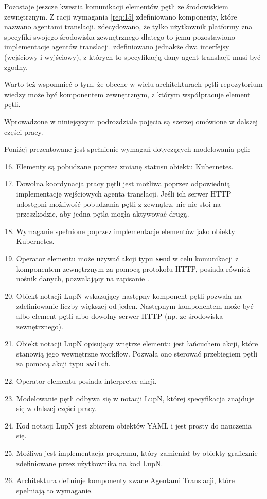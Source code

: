 Pozostaje jeszcze kwestia komunikacji elementów pętli ze środowiskiem zewnętrznym. Z racji wymagania \ref{req:15} zdefiniowano komponenty, które nazwano agentami translacji. zdecydowano, że tylko użytkownik platformy zna specyfiki swojego środowiska zewnętrznego dlatego to jemu pozostawiono implementacje agentów translacji. zdefiniowano jednakże dwa interfejsy (wejściowy i wyjściowy), z których to specyfikacją dany agent translacji musi być zgodny. 

Warto też wspomnieć o tym, że obecne w wielu architekturach pętli repozytorium wiedzy może być komponentem zewnętrznym, z którym współpracuje element pętli.

Wprowadzone w niniejsyzym podrozdziale pojęcia są szerzej omówione w dalszej części pracy. 

Poniżej prezentowane jest spełnienie wymagań dotyczących modelowania pęli:
\begin{enumerate}
    \setcounter{enumi}{15}
    \item Elementy są pobudzane poprzez zmianę statusu obiektu Kubernetes.
    \item Dowolna koordynacja pracy pętli jest możliwa poprzez odpowiednią implementację wejściowych agenta translacji. Jeśli ich serwer HTTP udostępni możliwość pobudzania pętli z zewnątrz, nic nie stoi na przeszkodzie, aby jedna pętla mogła aktywować drugą.
    \item Wymaganie spełnione poprzez implementacje elementów jako obiekty Kubernetes.
    \item Operator elementu może używać akcji typu \texttt{send} w celu komunikacji z komponentem zewnętrznym za pomocą protokołu HTTP, posiada również nośnik danych, pozwalający na zapisanie .
    \item Obiekt notacji LupN wskazujący następny komponent pętli pozwala na zdefiniowanie liczby większej od jeden. Następnym komponentem może być albo element pętli albo dowolny serwer HTTP (np. ze środowiska zewnętrznego).
    \item Obiekt notacji LupN opisujący wnętrze elementu jest łańcuchem akcji, które stanowią jego wewnętrzne workflow. Pozwala ono sterować przebiegiem pętli za pomocą akcji typu \texttt{switch}. 
    \item Operator elementu posiada interpreter akcji.
    \item Modelowanie pętli odbywa się w notacji LupN, której specyfikacja znajduje się w dalszej części pracy.
    \item Kod notacji LupN jest zbiorem obiektów YAML i jest prosty do nauczenia się.
    \item Możliwa jest implementacja programu, który zamieniał by obiekty graficznie zdefiniowane przez użytkownika na kod LupN.
    \item Architektura definiuje komponenty zwane Agentami Translacji, które spełniają to wymaganie.
\end{enumerate}
